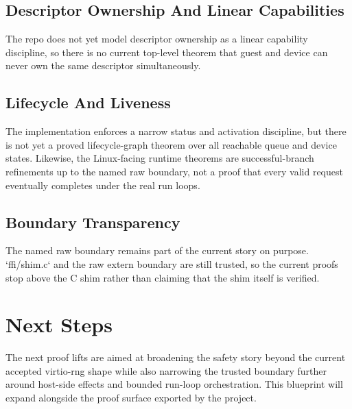 \section{Descriptor Ownership And Linear Capabilities}

The repo does not yet model descriptor ownership as a linear capability discipline, so there is no current top-level theorem that guest and device can never own the same descriptor simultaneously.

\section{Lifecycle And Liveness}

The implementation enforces a narrow status and activation discipline, but there is not yet a proved lifecycle-graph theorem over all reachable queue and device states.
Likewise, the Linux-facing runtime theorems are successful-branch refinements up to the named raw boundary, not a proof that every valid request eventually completes under the real run loops.

\section{Boundary Transparency}

The named raw boundary remains part of the current story on purpose.
`ffi/shim.c` and the raw extern boundary are still trusted, so the current proofs stop above the C shim rather than claiming that the shim itself is verified.

\chapter{Next Steps}

The next proof lifts are aimed at broadening the safety story beyond the current accepted virtio-rng shape while also narrowing the trusted boundary further around host-side effects and bounded run-loop orchestration.
This blueprint will expand alongside the proof surface exported by the project.